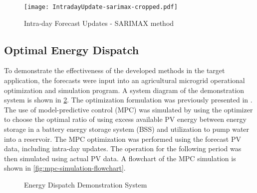 %

\begin{figure}[tbh]
	\centering
	\texttt{[image: IntradayUpdate-sarimax-cropped.pdf]}
	\caption{Intra-day Forecast Updates - SARIMAX method}
	\label{fig:intraday-forecast}
\end{figure}


\subsection{Optimal Energy Dispatch}

To demonstrate the effectiveness of the developed methods in the target application,
the forecasts were input into an agricultural microgrid operational optimization and simulation program.
A system diagram of the demonstration system is shown in \cref{fig:demo-system}.
The optimization formulation was previously presented in \cite{Brown2022}.
The use of model-predictive control (MPC) was simulated by using the optimizer to choose the optimal ratio of using excess available PV energy between energy storage in a battery energy storage system (BSS) and utilization to pump water into a reservoir.
The MPC optimization was performed using the forecast PV data, including intra-day updates.
The operation for the following period was then simulated using actual PV data.
A flowchart of the MPC simulation is shown in \cref{fig:mpc-simulation-flowchart}.

\begin{figure}[t]
	\centering
	\fontsize{6.7pt}{9pt}\selectfont
	\def\svgwidth{0.8\columnwidth}
	
	\caption{Energy Dispatch Demonstration System}
	\label{fig:demo-system}
\end{figure}

